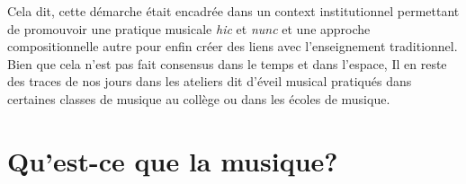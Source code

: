 \documentclass{article}
\begin{document}
\bigskip

Cela dit, cette démarche était encadrée dans un context institutionnel permettant de promouvoir une pratique musicale \textit{hic}  et \textit{nunc} et une approche compositionnelle autre pour enfin créer des liens avec l'enseignement traditionnel. Bien que cela n'est pas fait consensus dans le temps et dans l'espace, Il en reste des traces de nos jours dans les ateliers dit d'éveil musical pratiqués dans certaines classes de musique au collège ou dans les écoles de musique. 

%

\bigskip


\bigskip
%
%
\bigskip

%    
  

\section{Qu’est-ce que la musique?}
\end{document}
